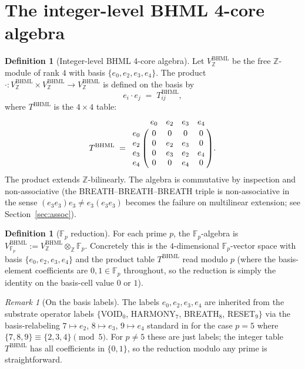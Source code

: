 \documentclass[11pt,reqno]{amsart}
\theoremstyle{plain}
\theoremstyle{definition}
\newtheorem{definition}[theorem]{Definition}
\theoremstyle{remark}
\newtheorem*{remark}{Remark}
\newcommand{\Z}{\mathbb{Z}}
\newcommand{\F}{\mathbb{F}}
\newcommand{\BHML}{\mathrm{BHML}}
\begin{document}
\section{The integer-level BHML 4-core algebra}
\label{sec:def}

\begin{definition}[Integer-level BHML 4-core algebra]
\label{def:bhml-z}
Let $V^{\BHML}_{\Z}$ be the free $\Z$-module of rank $4$ with basis
$\{e_{0}, e_{2}, e_{3}, e_{4}\}$. The product
$\cdot : V^{\BHML}_{\Z} \times V^{\BHML}_{\Z} \to V^{\BHML}_{\Z}$ is
defined on the basis by
\[
e_{i} \cdot e_{j} \;=\; T^{\BHML}_{ij},
\]
where $T^{\BHML}$ is the $4 \times 4$ table:
\[
T^{\BHML} \;=\;
\bordermatrix{
       & e_{0} & e_{2} & e_{3} & e_{4} \cr
e_{0}  & 0     & 0     & 0     & 0 \cr
e_{2}  & 0     & e_{2} & e_{3} & 0 \cr
e_{3}  & 0     & e_{3} & e_{2} & e_{4} \cr
e_{4}  & 0     & 0     & e_{4} & 0
}.
\]
The product extends $\Z$-bilinearly. The algebra is commutative by
inspection and non-associative (the BREATH--BREATH--BREATH triple is
non-associative in the sense $(e_{3} e_{3}) e_{3} \neq e_{3}
(e_{3} e_{3})$ becomes the failure on multilinear extension; see
Section~\ref{sec:assoc}).
\end{definition}

\begin{definition}[$\F_{p}$ reduction]
For each prime $p$, the $\F_{p}$-algebra is
$V^{\BHML}_{\F_{p}} := V^{\BHML}_{\Z} \otimes_{\Z} \F_{p}$. Concretely
this is the $4$-dimensional $\F_{p}$-vector space with basis
$\{e_{0}, e_{2}, e_{3}, e_{4}\}$ and the product table $T^{\BHML}$
read modulo $p$ (where the basis-element coefficients are
$0, 1 \in \F_{p}$ throughout, so the reduction is simply the
identity on the basis-cell value $0$ or $1$).
\end{definition}

\begin{remark}[On the basis labels]
The labels $e_{0}, e_{2}, e_{3}, e_{4}$ are inherited from the
substrate operator labels $\{$VOID$_{0}$, HARMONY$_{7}$,
BREATH$_{8}$, RESET$_{9}\}$ via the basis-relabeling
$7 \mapsto e_{2}$, $8 \mapsto e_{3}$, $9 \mapsto e_{4}$ standard in
\cite{SandersGishFourCore} for the case $p = 5$ where
$\{7, 8, 9\} \equiv \{2, 3, 4\} \pmod{5}$. For
$p \neq 5$ these are just labels; the integer table $T^{\BHML}$ has
all coefficients in $\{0, 1\}$, so the reduction modulo any prime is
straightforward.
\end{remark}
\end{document}
